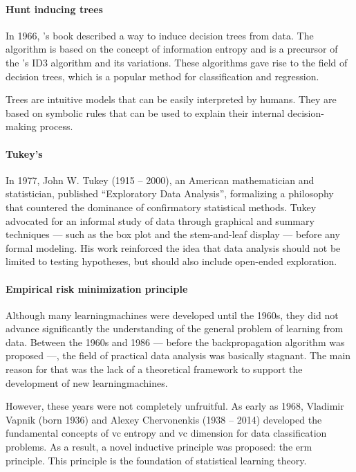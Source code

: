 \paragraph{Hunt inducing trees}

In 1966, \citeauthor{Hunt1966}'s book described a way to induce decision trees from
data.  The algorithm is based on the concept of information entropy and is a precursor of
the \citeauthor{Quinlan1986}'s ID3 algorithm and its variations.
These algorithms gave rise to the field of decision trees, which is a popular method for
classification and regression.

Trees are intuitive models that can be easily interpreted by humans.  They are based on
symbolic rules that can be used to explain their internal decision-making process.


\paragraph{Tukey's }

In 1977, John W. Tukey (1915 -- 2000), an American mathematician and statistician, published
``Exploratory Data Analysis'', formalizing a philosophy that
countered the dominance of confirmatory statistical methods.  Tukey advocated for an informal
study of data through graphical and summary techniques --- such as the box plot and the
stem-and-leaf display --- before any formal modeling.  His work reinforced the idea that data
analysis should not be limited to testing hypotheses, but should also include open-ended
exploration.

\paragraph{Empirical risk minimization principle}

Although many \glspl{learningmachine} were developed until the 1960s, they did not advance
significantly the understanding of the general problem of learning from data.  Between
the 1960s and 1986 --- before the backpropagation algorithm was proposed ---, the field of practical
data analysis was basically stagnant.  The main reason for that was the lack of a
theoretical framework to support the development of new \glspl{learningmachine}.

However, these years were not completely unfruitful.  As early as 1968, Vladimir Vapnik
(born 1936) and Alexey Chervonenkis (1938 -- 2014) developed the fundamental concepts of
\gls{vc} entropy and \gls{vc} dimension for data classification problems.  As a result, a novel inductive
principle was proposed: the \gls{erm} principle.
This principle is the foundation of statistical learning theory.

